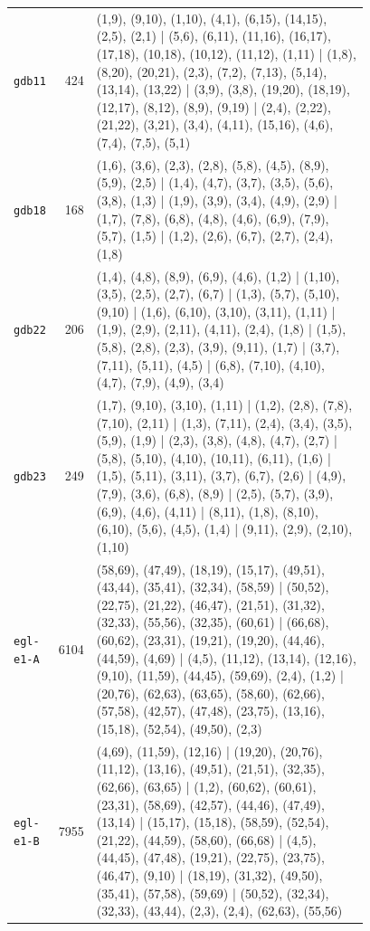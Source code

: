 \begin{landscape}
\begin{longtable}{lr>{\tiny\raggedright\arraybackslash}p{0.78\linewidth}}
\texttt{gdb11} & 424 & (1,9), (9,10), (1,10), (4,1), (6,15), (14,15), (2,5), (2,1) | (5,6), (6,11), (11,16), (16,17), (17,18), (10,18), (10,12), (11,12), (1,11) | (1,8), (8,20), (20,21), (2,3), (7,2), (7,13), (5,14), (13,14), (13,22) | (3,9), (3,8), (19,20), (18,19), (12,17), (8,12), (8,9), (9,19) | (2,4), (2,22), (21,22), (3,21), (3,4), (4,11), (15,16), (4,6), (7,4), (7,5), (5,1) \\[2pt]
\texttt{gdb18} & 168 & (1,6), (3,6), (2,3), (2,8), (5,8), (4,5), (8,9), (5,9), (2,5) | (1,4), (4,7), (3,7), (3,5), (5,6), (3,8), (1,3) | (1,9), (3,9), (3,4), (4,9), (2,9) | (1,7), (7,8), (6,8), (4,8), (4,6), (6,9), (7,9), (5,7), (1,5) | (1,2), (2,6), (6,7), (2,7), (2,4), (1,8) \\[2pt]
\texttt{gdb22} & 206 & (1,4), (4,8), (8,9), (6,9), (4,6), (1,2) | (1,10), (3,5), (2,5), (2,7), (6,7) | (1,3), (5,7), (5,10), (9,10) | (1,6), (6,10), (3,10), (3,11), (1,11) | (1,9), (2,9), (2,11), (4,11), (2,4), (1,8) | (1,5), (5,8), (2,8), (2,3), (3,9), (9,11), (1,7) | (3,7), (7,11), (5,11), (4,5) | (6,8), (7,10), (4,10), (4,7), (7,9), (4,9), (3,4) \\[2pt]
\texttt{gdb23} & 249 & (1,7), (9,10), (3,10), (1,11) | (1,2), (2,8), (7,8), (7,10), (2,11) | (1,3), (7,11), (2,4), (3,4), (3,5), (5,9), (1,9) | (2,3), (3,8), (4,8), (4,7), (2,7) | (5,8), (5,10), (4,10), (10,11), (6,11), (1,6) | (1,5), (5,11), (3,11), (3,7), (6,7), (2,6) | (4,9), (7,9), (3,6), (6,8), (8,9) | (2,5), (5,7), (3,9), (6,9), (4,6), (4,11) | (8,11), (1,8), (8,10), (6,10), (5,6), (4,5), (1,4) | (9,11), (2,9), (2,10), (1,10) \\[2pt]
\texttt{egl-e1-A} & 6104 & (58,69), (47,49), (18,19), (15,17), (49,51), (43,44), (35,41), (32,34), (58,59) | (50,52), (22,75), (21,22), (46,47), (21,51), (31,32), (32,33), (55,56), (32,35), (60,61) | (66,68), (60,62), (23,31), (19,21), (19,20), (44,46), (44,59), (4,69) | (4,5), (11,12), (13,14), (12,16), (9,10), (11,59), (44,45), (59,69), (2,4), (1,2) | (20,76), (62,63), (63,65), (58,60), (62,66), (57,58), (42,57), (47,48), (23,75), (13,16), (15,18), (52,54), (49,50), (2,3) \\[2pt]
\texttt{egl-e1-B} & 7955 & (4,69), (11,59), (12,16) | (19,20), (20,76), (11,12), (13,16), (49,51), (21,51), (32,35), (62,66), (63,65) | (1,2), (60,62), (60,61), (23,31), (58,69), (42,57), (44,46), (47,49), (13,14) | (15,17), (15,18), (58,59), (52,54), (21,22), (44,59), (58,60), (66,68) | (4,5), (44,45), (47,48), (19,21), (22,75), (23,75), (46,47), (9,10) | (18,19), (31,32), (49,50), (35,41), (57,58), (59,69) | (50,52), (32,34), (32,33), (43,44), (2,3), (2,4), (62,63), (55,56) \\[2pt]

\end{longtable}
\end{landscape}
